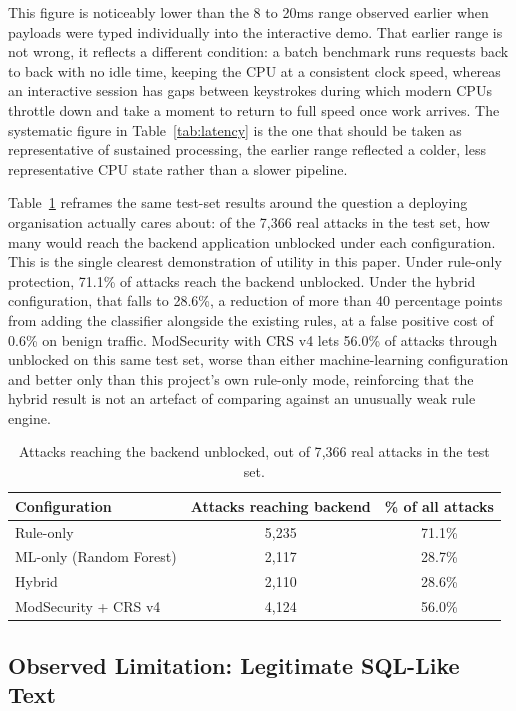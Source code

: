 \documentclass[runningheads]{llncs}
\begin{document}
This figure is noticeably lower than the 8 to 20ms range observed
earlier when payloads were typed individually into the interactive
demo. That earlier range is not wrong, it reflects a different
condition: a batch benchmark runs requests back to back with no idle
time, keeping the CPU at a consistent clock speed, whereas an
interactive session has gaps between keystrokes during which modern
CPUs throttle down and take a moment to return to full speed once work
arrives. The systematic figure in Table~\ref{tab:latency} is the one
that should be taken as representative of sustained processing, the
earlier range reflected a colder, less representative CPU state rather
than a slower pipeline.

Table~\ref{tab:passthrough} reframes the same test-set results around
the question a deploying organisation actually cares about: of the
7{,}366 real attacks in the test set, how many would reach the backend
application unblocked under each configuration. This is the single
clearest demonstration of utility in this paper. Under rule-only
protection, 71.1\% of attacks reach the backend unblocked. Under the
hybrid configuration, that falls to 28.6\%, a reduction of more than
40 percentage points from adding the classifier alongside the existing
rules, at a false positive cost of 0.6\% on benign traffic. ModSecurity
with CRS v4 lets 56.0\% of attacks through unblocked on this same test
set, worse than either machine-learning configuration and better only
than this project's own rule-only mode, reinforcing that the hybrid
result is not an artefact of comparing against an unusually weak rule
engine.

\begin{table}[t]
\centering
\caption{Attacks reaching the backend unblocked, out of 7{,}366 real
attacks in the test set.}
\label{tab:passthrough}
\begin{tabular}{lcc}
\toprule
Configuration & Attacks reaching backend & \% of all attacks \\
\midrule
Rule-only               & 5{,}235 & 71.1\% \\
ML-only (Random Forest) & 2{,}117 & 28.7\% \\
Hybrid                  & 2{,}110 & 28.6\% \\
ModSecurity + CRS v4    & 4{,}124 & 56.0\% \\
\bottomrule
\end{tabular}
\end{table}

\subsection{Observed Limitation: Legitimate SQL-Like Text}
\end{document}
